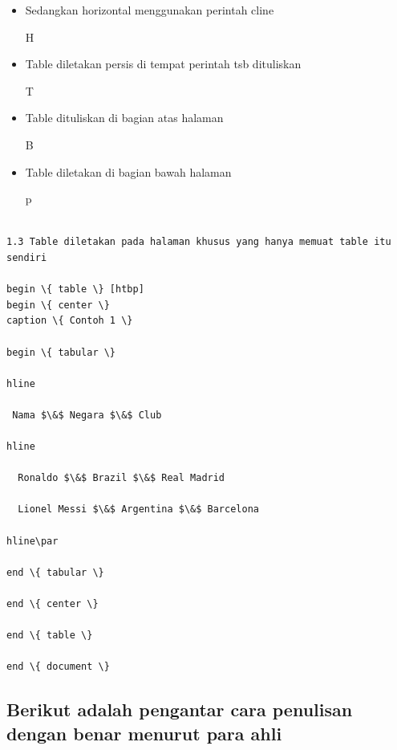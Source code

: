 \begin{itemize}
\vspace{\baselineskip}
	\item Sedangkan horizontal menggunakan perintah cline\par

H\par

\vspace{\baselineskip}
	\item Table diletakan persis di tempat perintah tsb dituliskan\par

T\par

	\item Table dituliskan di bagian atas halaman\par

\vspace{\baselineskip}
B\par

	\item Table diletakan di bagian bawah halaman\par 

\vspace{\baselineskip}
p\par
\end{itemize}

\begin{verbatim}
	
1.3 Table diletakan pada halaman khusus yang hanya memuat table itu sendiri

begin \{ table \} [htbp]
begin \{ center \} 
caption \{ Contoh 1 \} 

begin \{ tabular \}

hline

 Nama $\&$ Negara $\&$ Club

hline

  Ronaldo $\&$ Brazil $\&$ Real Madrid 

  Lionel Messi $\&$ Argentina $\&$ Barcelona

hline\par

end \{ tabular \} 

end \{ center \} 

end \{ table \} 

end \{ document \} 

\end{verbatim}

\vspace{\baselineskip}
\subsection{Berikut adalah pengantar cara penulisan dengan benar menurut para ahli}

